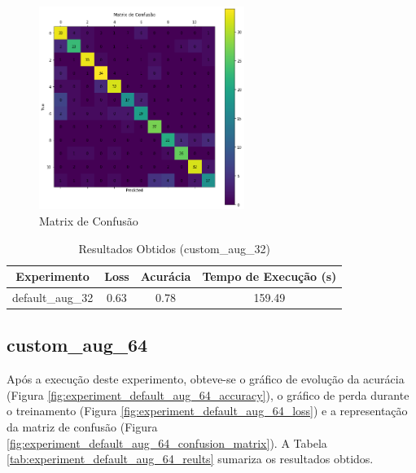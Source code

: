 \documentclass[12pt]{article}
\begin{document}
\begin{figure}[!htb]
  \centering
  \includegraphics[width=18em]{experiments/default_aug_32/confusion_matrix.png}
  \caption{Matrix de Confusão}
  \label{fig:experiment_default_aug_32_confusion_matrix}
\end{figure}

\begin{table}[!htb]
  \centering
  \begin{tabular}{|c|c|c|c|}
    \hline
    \textbf{Experimento} & \textbf{Loss} & \textbf{Acurácia} & \textbf{Tempo de Execução (s)} \\ \hline
    default\_aug\_32     & 0.63          & 0.78              & 159.49                         \\ \hline
  \end{tabular}
  \caption{Resultados Obtidos (custom\_aug\_32)}
  \label{tab:experiment_default_aug_32_reults}
\end{table}

\newpage

\subsection{custom\_aug\_64}

Após a execução deste experimento, obteve-se o gráfico de evolução da acurácia (Figura \ref{fig:experiment_default_aug_64_accuracy}), o gráfico de perda durante o treinamento (Figura \ref{fig:experiment_default_aug_64_loss}) e a representação da matriz de confusão (Figura \ref{fig:experiment_default_aug_64_confusion_matrix}). A Tabela \ref{tab:experiment_default_aug_64_reults} sumariza os resultados obtidos.
\end{document}
